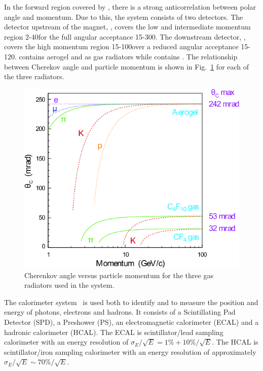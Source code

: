 In the forward region covered by \lhcb, there is a strong anticorrelation between polar angle and momentum. Due to this, the \rich system consists of two detectors. The detector upstream of the magnet, \richone, covers the low and intermediate momentum region 2-40\gevc for the full angular acceptance 15-300\mrad. The downstream detector, \richtwo, covers the high momentum region 15-100\gevc over a reduced angular acceptance 15-120\mrad. \richone contains aerogel and \cfourften as gas radiators while \richtwo contains \cffour. The relationship between Cherekov angle and particle momentum is shown in Fig.~\ref{fig:radiators} for each of the three radiators.

\begin{figure}[!tb]
\centering
\includegraphics[height=0.3\textheight]{figs/detector/radiators.png}
\caption{Cherenkov angle versus particle momentum for the three gas radiators used in the \rich system.}
\label{fig:radiators}
\end{figure}

The calorimeter system~\cite{calo-tdr} is used both to identify and to measure the position and energy of photons, electrons and hadrons. It consists of a Scintillating Pad Detector (SPD), a Preshower (PS), an electromagnetic calorimeter (ECAL) and a hadronic calorimeter (HCAL). The ECAL is scintillator/lead sampling calorimeter with an energy resolution of $\sigma_{E}/\sqrt{E} = 1\% + 10\%/\sqrt{E}$. The HCAL is scintillator/iron sampling calorimeter with an energy resolution of approximately $\sigma_{E}/\sqrt{E} \sim 70\%/\sqrt{E}$. 

